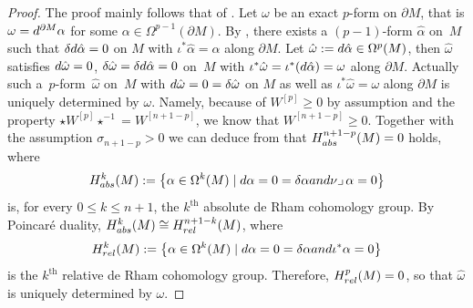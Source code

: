 \documentclass[11pt]{article}
\numberwithin{equation}{section}
\numberwithin{equation}{section}
\begin{document}
\begin{proof}
The proof mainly follows that of \cite[Theorem 5]{RaulotSavo11}.
Let $\omega$ be an exact $p$-form on $\partial M$, that is $\omega={\rm d}^{\partial M}\alpha$ for some $\alpha\in\Omega^{p-1}(\partial M)$.
By \cite[Theorem 2]{DuffSpencer52}, there exists a $(p-1)$-form $\hat{\alpha}$ on~$M$ such that $\delta {\rm d}\hat{\alpha}=0$ on $M$ with $\iota^*\hat{\alpha}=\alpha$ along $\partial M$. Let $\hat{\omega}:={\rm d}\hat{\alpha}\in\Omega^p(M)$, then $\hat{\omega}$ satisfies ${\rm d}\hat{\omega}=0$, $\delta\hat{\omega}=\delta {\rm d}\hat{\alpha}=0$ on~$M$ with $\iota^*\hat{\omega}=\iota^*({\rm d}\hat{\alpha})=\omega$ along $\partial M$. Actually such a~$p$-form~$\hat{\omega}$ on~$M$ with ${\rm d}\hat{\omega}=0=\delta\hat{\omega}$ on $M$ as well as $\iota^*\hat{\omega}=\omega$ along $\partial M$ is uniquely determined by $\omega$. Namely, because of $W^{[p]}\geq0$ by assumption and the property $\star W^{[p]}\star^{-1}=W^{[n+1-p]}$, we know that $W^{[n+1-p]}\geq0$. Together with the assumption $\sigma_{n+1-p}>0$ we can deduce from \cite[Theorem~4]{RaulotSavo11} that $H_{\rm abs}^{n+1-p}(M)=0$  holds, where
\[H_{\rm abs}^{k}(M) :=\bigl\{\alpha\in\Omega^k(M) \mid {\rm d}\alpha=0=\delta\alpha\textrm{ and }\nu\lrcorner\,\alpha=0\bigr\}\]
is, for every $0\leq k\leq n+1$, the $k^{\textrm{th}}$ absolute de Rham cohomology group. By Poincar\'e duality, $H_{\rm abs}^{k}(M)\cong H_{\rm rel}^{n+1-k}(M)$,  where
\[H_{\rm rel}^{k}(M):=\bigl\{\alpha\in\Omega^k(M) \mid {\rm d}\alpha=0=\delta\alpha\textrm{ and }\iota^*\alpha=0\bigr\}\]
is the $k^{\textrm{th}}$ relative de Rham cohomology group. Therefore, $H_{\rm rel}^{p}(M)=0$, so that $\hat{\omega}$ is uniquely determined by $\omega$.


\end{proof}
\end{document}
